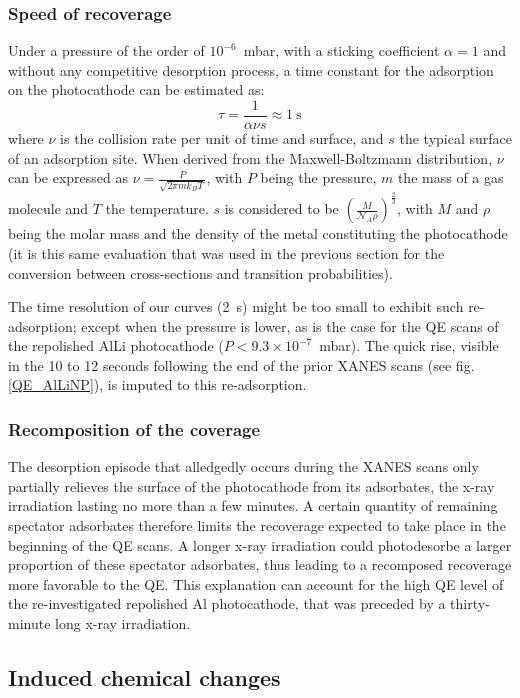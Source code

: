 \documentclass[aip,graphicx]{revtex4-1}
\begin{document}
\subsubsection*{Speed of recoverage}
Under a pressure of the order of $10^{-6}$~mbar, with a sticking coefficient $\alpha=1$ and without any competitive desorption process, a time constant for the adsorption on the photocathode can be estimated as:
\begin{equation}
\tau=\frac{1}{\alpha\nu s}\approx 1~\mbox{s}
\end{equation}
where $\nu$ is the collision rate per unit of time and surface, and $s$ the typical surface of an adsorption site. When derived from the Maxwell-Boltzmann distribution, $\nu$ can be expressed as $\nu=\frac{P}{\sqrt{2\pi m k_B T}}$, with $P$ being the pressure, $m$ the mass of a gas molecule and $T$ the temperature. $s$ is considered to be $\left(\frac{M}{\mathcal{N}_A \rho}\right)^{\frac{2}{3}}$, with $M$ and $\rho$ being the molar mass and the density of the metal constituting the photocathode (it is this same evaluation that was used in the previous section for the conversion between cross-sections and transition probabilities).

The time resolution of our curves (2~s) might be too small to exhibit such re-adsorption; except when the pressure is lower, as is the case for the QE scans of the repolished AlLi photocathode ($P<9.3\times10^{-7}$~mbar). The quick rise, visible in the 10 to 12 seconds following the end of the prior XANES scans (see fig. \ref{QE_AlLiNP}), is imputed to this re-adsorption.

\subsubsection*{Recomposition of the coverage}
The desorption episode that alledgedly occurs during the XANES scans only partially relieves the surface of the photocathode from its adsorbates, the x-ray irradiation lasting no more than a few minutes. A certain quantity of remaining spectator adsorbates therefore limits the recoverage expected to take place in the beginning of the QE scans. A longer x-ray irradiation could photodesorbe a larger proportion of these spectator adsorbates, thus leading to a recomposed recoverage more favorable to the QE. This explanation can account for the high QE level of the re-investigated repolished Al photocathode, that was preceded by a thirty-minute long x-ray irradiation.

\subsection{Induced chemical changes}
\end{document}
